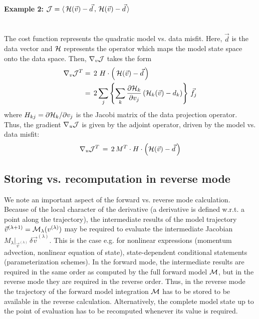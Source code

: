 \paragraph{Example 2: 
$ {\cal J} = \langle \, {\cal H}(\vec{v}) - \vec{d} \, , 
 \, {\cal H}(\vec{v}) - \vec{d} \, \rangle $} ~ \\
The cost function represents the quadratic model vs. data misfit.
Here, $ \vec{d} $ is the data vector and $ {\cal H} $ represents the
operator which maps the model state space onto the data space.
Then, $ \nabla_v {\cal J} $ takes the form
%
\begin{equation*}
\begin{split}
\nabla_v {\cal J}^T & = \, 2 \, \, H \cdot 
\left( \, {\cal H}(\vec{v}) - \vec{d} \, \right) \\
~          & = \, 2 \sum_{j} \left\{ \sum_k
\frac{\partial {\cal H}_k}{\partial v_{j}} 
\left( {\cal H}_k (\vec{v}) - d_k \right)
\right\} \, {\vec{f}_{j}} \\
\end{split}
\end{equation*}
%
where $H_{kj} = \partial {\cal H}_k / \partial v_{j} $ is the 
Jacobi matrix of the data projection operator.
Thus, the gradient $ \nabla_u {\cal J} $ is given by the 
adjoint operator,
driven by the model vs. data misfit:
\[
\nabla_u {\cal J}^T \, = \, 2 \, M^T \cdot 
H \cdot \left( {\cal H}(\vec{v}) - \vec{d} \, \right)
\]

\subsection{Storing vs. recomputation in reverse mode}
\label{checkpointing}

We note an important aspect of the forward vs. reverse 
mode calculation.
Because of the local character of the derivative
(a derivative is defined w.r.t. a point along the trajectory),
the intermediate results of the model trajectory
$\vec{v}^{(\lambda+1)}={\cal M}_{\lambda}(v^{(\lambda)})$ 
may be required to evaluate the intermediate Jacobian 
$M_{\lambda}|_{\vec{v}^{(\lambda)}} \, \delta \vec{v}^{(\lambda)} $.
This is the case e.g. for nonlinear expressions
(momentum advection, nonlinear equation of state), state-dependent
conditional statements (parameterization schemes).
In the forward mode, the intermediate results are required
in the same order as computed by the full forward model ${\cal M}$,
but in the reverse mode they are required in the reverse order.
Thus, in the reverse mode the trajectory of the forward model
integration ${\cal M}$ has to be stored to be available in the reverse
calculation. Alternatively, the complete model state up to the
point of evaluation has to be recomputed whenever its value is required.

